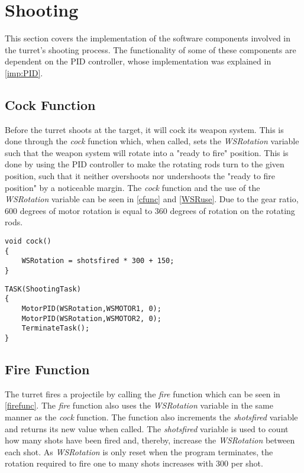 \section{Shooting}
This section covers the implementation of the software components involved in the turret's shooting process. The functionality of some of these components are dependent on the PID controller, whose implementation was explained in \cref{imp:PID}.

\subsection{Cock Function}
Before the turret shoots at the target, it will cock its weapon system. This is done through the \emph{cock} function which, when called, sets the \emph{WSRotation} variable such that the weapon system will rotate into a "ready to fire" position. This is done by using the PID controller to make the rotating rods turn to the given position, such that it neither overshoots nor undershoots the "ready to fire position" by a noticeable margin. The \emph{cock} function and the use of the \emph{WSRotation} variable can be seen in \cref{cfunc} and \cref{WSRuse}. Due to the gear ratio, 600 degrees of motor rotation is equal to 360 degrees of rotation on the rotating rods.

\begin{lstlisting}[style=customc, label={cfunc}, caption={Cock function}]
void cock()
{
	WSRotation = shotsfired * 300 + 150;
}
\end{lstlisting}

\begin{lstlisting}[style=customc, label={WSRuse}, caption={WSRotation variable used in a PID function call}]
TASK(ShootingTask)
{
	MotorPID(WSRotation,WSMOTOR1, 0);
	MotorPID(WSRotation,WSMOTOR2, 0);
    TerminateTask();
}
\end{lstlisting}

\subsection{Fire Function}
The turret fires a projectile by calling the \emph{fire} function which can be seen in \cref{firefunc}. The \emph{fire} function also uses the \emph{WSRotation} variable in the same manner as the \emph{cock} function. The function also increments the \emph{shotsfired} variable and returns its new value when called. The \emph{shotsfired} variable is used to count how many shots have been fired and, thereby, increase the \emph{WSRotation} between each shot. As \emph{WSRotation} is only reset when the program terminates, the rotation required to fire one to many shots increases with 300 per shot.

